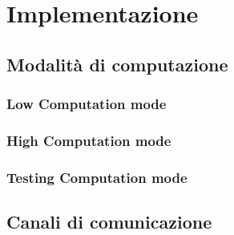 \chapter{Implementazione}
\label{implementazione}

\section{Modalità di computazione}
\label{computationMode}
\subsection{Low Computation mode}

\subsection{High Computation mode}

\subsection{Testing Computation mode}
\label{tcm}


\section{Canali di comunicazione}

